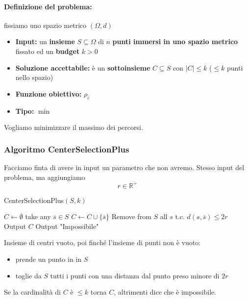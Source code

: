 \paragraph{Definizione del problema:} fissiamo uno spazio metrico $(\Omega, d)$
\begin{itemize}
	\item \textbf{Input:} un \textbf{insieme} $S \subseteq \Omega$ di $n$ \textbf{punti immersi in uno spazio metrico} fissato ed un \textbf{budget} $k>0$
	
	\item \textbf{Soluzione accettabile:} è un \textbf{sottoinsieme} $C \subseteq S$ con $|C| \leq k$ ($\leq k$ punti nello spazio)
	
	\item \textbf{Funzione obiettivo:} $\rho_c$
	
	\item \textbf{Tipo:} $\min$
\end{itemize}
Vogliamo minimizzare il massimo dei percorsi.\\

\subsubsection{Algoritmo CenterSelectionPlus} 
Facciamo finta di avere in input un parametro che non avremo. Stesso input del problema, ma aggiungiamo 
$$ r \in \mathbb{R}^+ $$

\begin{algorithm}
	\caption{CenterSelectionPlus$(S, k)$}
	\begin{algorithmic}
		\STATE $C \leftarrow \emptyset$
		\STATE take any $\overline{s} \in S$
		\STATE $C \leftarrow C \cup \{\overline{s}\}$
		\STATE Remove from $S$ all $s$ t.c. $d(s, \overline{s}) \leq 2r$
		\ENDWHILE
		\STATE Output $C$
		\ELSE
		\STATE Output "Impossibile"
		\ENDIF
	\end{algorithmic}
\end{algorithm}

Insieme di centri vuoto, poi finché l'insieme di punti non è vuoto: 
\begin{itemize}
	\item prende un punto in in $S$
	\item toglie da $S$ tutti i punti con una distanza dal punto preso minore di $2r$
\end{itemize}

Se la cardinalità di $C$ è $\leq k$ torna $C$, altrimenti dice che è impossibile.\\

